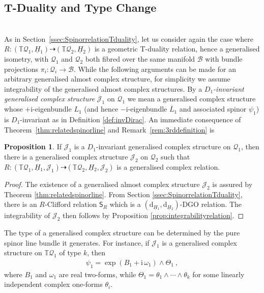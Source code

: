 \documentclass[a4paper, reqno, 11pt]{amsart}
\numberwithin{equation}{section}
\theoremstyle{definition}
\newtheorem{proposition}[equation]{Proposition}
\newcommand{\red}[1]{\underline{#1}}
\newcommand{\de}{\mathrm{d}}
\newcommand{\ii}{\mathrm{i}}
\newcommand{\IT}{\mathbb{T}}
\newcommand{\cB}{{\mathcal B}}
\newcommand{\cQ}{{\mathcal Q}}
\newcommand{\cJ}{{\mathcal J}}
\newcommand{\sfS}{{\mathsf{S}}}
\newcommand{\rel}{\dashrightarrow}
\theoremstyle{remark}
\begin{document}
\subsection{T-Duality and Type Change}~\\[5pt]
As in Section~\ref{ssec:SpinorrelationTduality}, let us consider again the case where $R\colon (\IT \cQ_1, \red H{}_1) \rel (\IT \cQ_2, \red H{}_2)$ is a geometric T-duality relation, hence a generalised isometry, with $\cQ_1$ and $\cQ_2$ both fibred over the same manifold $\cB$ with bundle projections $\pi_i:\cQ_i\to\cB$. While the following arguments can be made for an arbitrary generalised almost complex structure,  for simplicity we assume integrability of the generalised almost complex structures. By a \emph{$D_1$-invariant generalised complex structure} $\cJ_1$ on $\cQ_1$ we mean a generalised complex structure whose $+\ii$-eigenbundle $L_1$ (and hence $-\ii$-eigenbundle $\overline L_1$ and associated spinor $\psi_{1}$) is $D_1$-invariant as in Definition \ref{def:invDirac}. An immediate consequence of Theorem~\ref{thm:relatedspinorline} and Remark~\ref{rem:3rddefinition} is 

\begin{proposition}\label{prop:TdualGCS}
    If $\cJ_1$ is a $D_1$-invariant generalised complex structure on $\cQ_1$, then there is a generalised complex structure $\cJ_2$ on $\cQ_2$ such that $R\colon(\IT \cQ_1, \red H{}_1, \cJ_1) \rel (\IT \cQ_2, \red H{}_2, \cJ_2)$ is a generalised complex relation.
\end{proposition}

\begin{proof}
    The existence of a generalised almost complex structure $\cJ_2$ is assured by Theorem \ref{thm:relatedspinorline}. From Section \ref{ssec:SpinorrelationTduality}, there is an $R$-Clifford relation $\sfS_R$ which is a $(\de_{\red H{}_1}, \de_{\red H{}_2})$-DGO relation. The integrability of $\cJ_2$ then follows by Proposition \ref{prop:integrabilityrelation}.
\end{proof}

The type of a generalised complex structure can be determined by the pure spinor line bundle it generates. For instance, if $\cJ_1$ is a generalised complex structure on $\IT \cQ_1$ of type $k$, then 
\begin{align}
    \psi_{1} = \exp(B_1+\ii\,\omega_1) \wedge \Theta_1 \ ,
\end{align}
where $B_1$ and  $\omega_1$ are real two-forms, while $\Theta_1 = \theta_1 \wedge \cdots \wedge \theta_k$ for some linearly independent complex one-forms $\theta_i$. 
\end{document}

